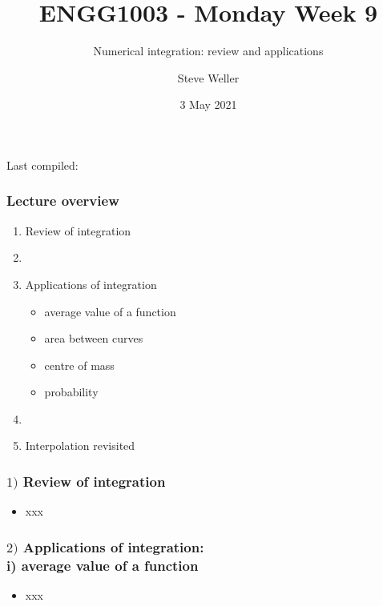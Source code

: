 \documentclass[english,14pt]{beamer}
\title{ENGG1003 - Monday Week 9}
\subtitle{Numerical integration: review and applications}%
\author{Steve Weller}
\institute{University of Newcastle}
\date{3 May 2021}
\begin{document}
\begin{flushleft}
{\scriptsize Last compiled:~\DTMnow}
\vspace*{-5mm}
\end{flushleft}
\framebreak


\begin{frame}[fragile]

\frametitle{Lecture overview}
\begin{enumerate}
	\item Review of integration
	
	\item[]
	
	\item Applications of integration
		\begin{itemize}
			\item average value of a function
			\item area between curves
			\item centre of mass
			\item probability
		\end{itemize}
	\item[]
	
	\item Interpolation revisited
	
\end{enumerate}

\end{frame}


\begin{frame}[fragile]

\frametitle{$1)$ Review of integration}

\begin{itemize}
	\item xxx
\end{itemize}

\end{frame}


\begin{frame}[fragile]

\frametitle{$2)$ Applications of integration: \\ \qquad i) average value of a function}

\begin{itemize}
	\item xxx
\end{itemize}

\end{frame}
\end{document}
